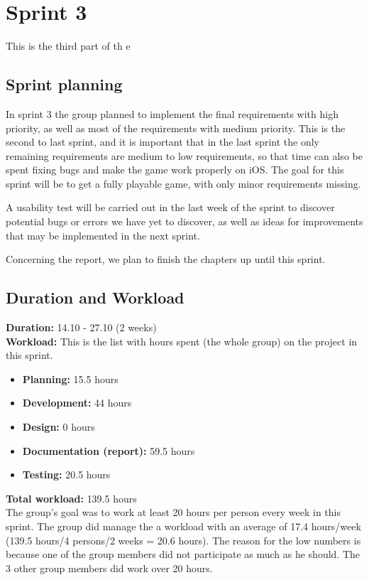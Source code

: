 \section{Sprint 3}
	
	This is the third part of th e

\subsection{Sprint planning}
	In sprint 3 the group planned to implement the final requirements with high priority, as well as most of the requirements with medium priority. This is the second to last sprint, and it is important that in the last sprint the  only remaining requirements are medium to low requirements, so that time can also be spent fixing bugs and make the game work properly on iOS. The goal for this sprint will be to get a fully playable game, with only minor requirements missing.

	A usability test will be carried out in the last week of the sprint to discover potential bugs or errors we have yet to discover, as well as ideas for improvements that may be implemented in the next sprint.

	Concerning the report, we plan to finish the chapters up until this sprint.

\subsection{Duration and Workload}
	
	{\bf Duration:} 14.10 - 27.10 (2 weeks)\\
	{\bf Workload:} This is the list with hours spent (the whole group) on the project in this sprint.
	\begin{itemize}
		\item {\bf Planning:} 15.5 hours
		\item {\bf Development:} 44 hours
		\item {\bf Design:} 0 hours
		\item {\bf Documentation (report):} 59.5 hours
		\item {\bf Testing:} 20.5 hours 
	\end{itemize}
	{\bf Total workload: } 139.5 hours \\
	
	The group's goal was to work at least 20 hours per person every week in this sprint. 
	The group did manage the a workload with an average of 17.4 hours/week (139.5 hours/4 persons/2 weeks = 20.6 hours). The reason for the low numbers is because one of the group members did not
	participate as much as he should. The 3 other group members did work over 20 hours. 


